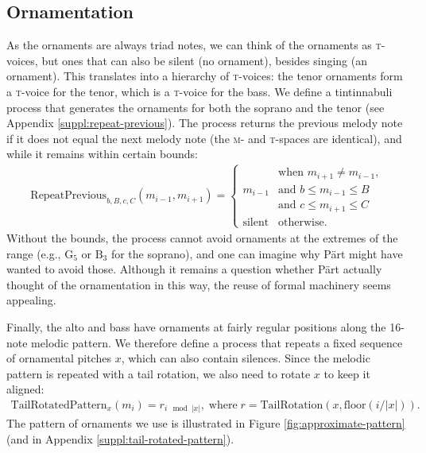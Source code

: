 \documentclass{interact}
\newcommand{\spn}[2]{\text{#1}_{#2}}
\newcommand{\MM}{\textsc{m}}
\newcommand{\TT}{\textsc{t}}
\begin{document}
\subsection{Ornamentation}

As the ornaments are always triad notes, we can think of the ornaments as \TT-voices, but ones that can also be silent (no ornament), besides singing (an ornament).
This translates into a hierarchy of \TT-voices: the tenor ornaments form a \TT-voice for the tenor, which is a \TT-voice for the bass.
We define a tintinnabuli process that generates the ornaments for both the soprano and the tenor (see Appendix \ref{suppl:repeat-previous}).
The process returns the previous melody note if it does not equal the next melody note (the \MM- and \TT-spaces are identical), and while it remains within certain bounds:
%
\begin{align}
    \text{RepeatPrevious}_{b,B,c,C}(m_{i-1}, m_{i+1}) =
        \begin{cases}
                       & \text{when $m_{i+1} \neq m_{i-1}$,}\\    
        m_{i-1}        & \text{and $b \le m_{i-1} \le B$}\\
                       & \text{and $c \le m_{i+1} \le C$}\\    
        \text{silent}  & \text{otherwise}.
        \end{cases}
\end{align}
%
Without the bounds, the process cannot avoid ornaments at the extremes of the range (e.g., $\spn{G}{5}$ or $\spn{B}{3}$ for the soprano), and one can imagine why Pärt might have wanted to avoid those.
Although it remains a question whether Pärt actually thought of the ornamentation in this way, the reuse of formal machinery seems appealing.


Finally, the alto and bass have ornaments at fairly regular positions along the 16-note melodic pattern.
We therefore define a process that repeats a fixed sequence of ornamental pitches $x$, which can also contain silences.
Since the melodic pattern is repeated with a tail rotation, we also need to rotate $x$ to keep it aligned:
%
\begin{align}
    \text{TailRotatedPattern}_x(m_i) = r_{i \mod |x|}, 
    \; \text{where} \; r = \text{TailRotation}(x, \text{floor}(i / |x|)).
\end{align}
%
The pattern of ornaments we use is illustrated in Figure \ref{fig:approximate-pattern} (and in Appendix \ref{suppl:tail-rotated-pattern}).
\end{document}
